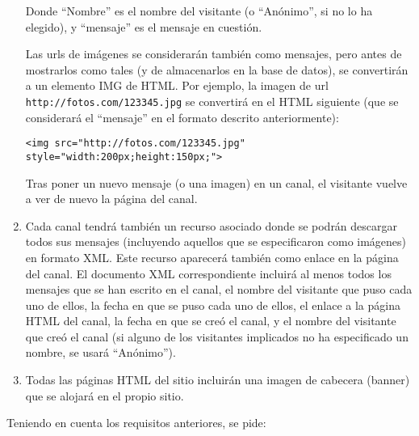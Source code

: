 \begin{enumerate}
Donde ``Nombre'' es el nombre del visitante (o ``Anónimo'', si no lo ha elegido), y ``mensaje'' es el mensaje en cuestión.

Las urls de imágenes se considerarán también como mensajes, pero antes de mostrarlos como tales (y de almacenarlos en la base de datos), se convertirán a un elemento IMG de HTML. Por ejemplo, la imagen de url \verb|http://fotos.com/123345.jpg| se convertirá en el HTML siguiente (que se considerará el ``mensaje'' en el formato descrito anteriormente):

\begin{verbatim}
<img src="http://fotos.com/123345.jpg" style="width:200px;height:150px;">
\end{verbatim}

Tras poner un nuevo mensaje (o una imagen) en un canal, el visitante vuelve a ver de nuevo la página del canal.

\item Cada canal tendrá también un recurso asociado donde se podrán descargar todos sus mensajes (incluyendo aquellos que se especificaron como imágenes) en formato XML. Este recurso aparecerá también como enlace en la página del canal. El documento XML correspondiente incluirá al menos todos los mensajes que se han escrito en el canal, el nombre del visitante que puso cada uno de ellos, la fecha en que se puso cada uno de ellos, el enlace a la página HTML del canal, la fecha en que se creó el canal, y el nombre del visitante que creó el canal (si alguno de los visitantes implicados no ha especificado un nombre, se usará ``Anónimo'').
\item Todas las páginas HTML del sitio incluirán una imagen de cabecera (banner) que se alojará en el propio sitio.
\end{enumerate}

Teniendo en cuenta los requisitos anteriores, se pide:

